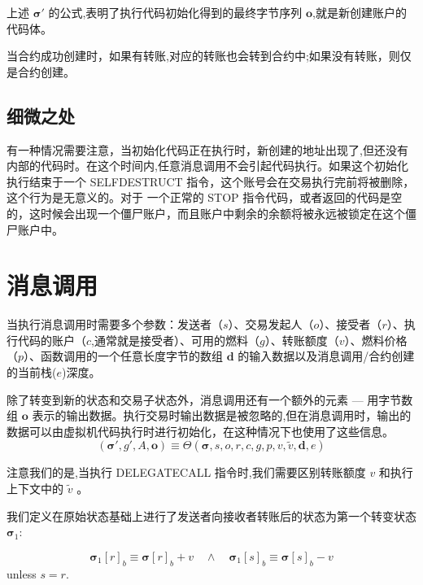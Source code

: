 \documentclass[9pt,oneside]{amsart}
\begin{document}
\begin{multicols}{2}
上述 $\boldsymbol{\sigma}'$ 的公式,表明了执行代码初始化得到的最终字节序列 $\mathbf{o}$,就是新创建账户的代码体。

当合约成功创建时，如果有转账,对应的转账也会转到合约中;如果没有转账，则仅是合约创建。

\subsection{细微之处}
有一种情况需要注意，当初始化代码正在执行时，新创建的地址出现了,但还没有内部的代码时。在这个时间内,任意消息调用不会引起代码执行。如果这个初始化执行结束于一个 {\small SELFDESTRUCT} 指令，这个账号会在交易执行完前将被删除，这个行为是无意义的。对于 一个正常的 {\small STOP} 指令代码，或者返回的代码是空的，这时候会出现一个僵尸账户，而且账户中剩余的余额将被永远被锁定在这个僵尸账户中。

\section{消息调用} \label{ch:call}
当执行消息调用时需要多个参数：发送者（$s$）、交易发起人（$o$）、接受者（$r$）、执行代码的账户（$c$,通常就是接受者）、可用的燃料（$g$）、转账额度（$v$）、燃料价格（$p$）、函数调用的一个任意长度字节的数组 $\mathbf{d}$ 的输入数据以及消息调用/合约创建的当前栈($e$)深度。

除了转变到新的状态和交易子状态外，消息调用还有一个额外的元素 --- 用字节数组 $\mathbf{o}$ 表示的输出数据。执行交易时输出数据是被忽略的,但在消息调用时，输出的数据可以由虚拟机代码执行时进行初始化，在这种情况下也使用了这些信息。
\begin{equation}
(\boldsymbol{\sigma}', g', A, \mathbf{o}) \equiv \Theta(\boldsymbol{\sigma}, s, o, r, c, g, p, v, \tilde{v}, \mathbf{d}, e)
\end{equation}

注意我们的是,当执行 {\small DELEGATECALL}  指令时,我们需要区别转账额度 $v$ 和执行上下文中的 $\tilde{v}$ 。


我们定义在原始状态基础上进行了发送者向接收者转账后的状态为第一个转变状态 $\boldsymbol{\sigma}_1$:

\begin{equation}
\boldsymbol{\sigma}_1[r]_b \equiv \boldsymbol{\sigma}[r]_b + v \quad\wedge\quad \boldsymbol{\sigma}_1[s]_b \equiv \boldsymbol{\sigma}[s]_b - v
\end{equation}
unless $s = r$.


\end{multicols}
\end{document}
